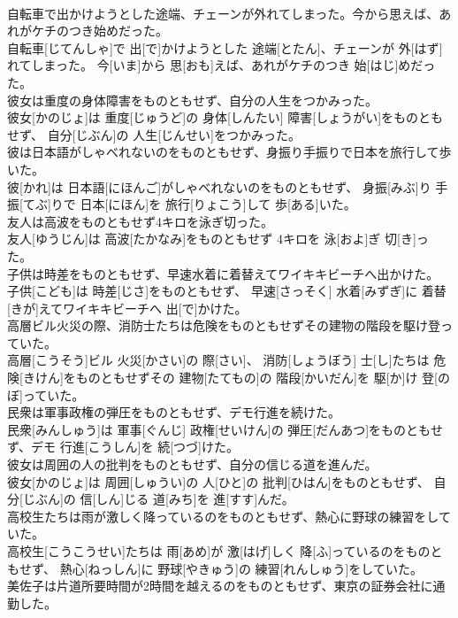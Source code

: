 \documentclass[8pt]{extreport}
\begin{document}
\begin{CJK}{UTF8}{min}
\\	自転車で出かけようとした途端、チェーンが外れてしまった。今から思えば、あれがケチのつき始めだった。	
\\	自転車[じてんしゃ]で 出[で]かけようとした 途端[とたん]、チェーンが 外[はず]れてしまった。 今[いま]から 思[おも]えば、あれがケチのつき 始[はじ]めだった。
\\	彼女は重度の身体障害をものともせず、自分の人生をつかみった。	
\\	彼女[かのじょ]は 重度[じゅうど]の 身体[しんたい] 障害[しょうがい]をものともせず、 自分[じぶん]の 人生[じんせい]をつかみった。
\\	彼は日本語がしゃべれないのをものともせず、身振り手振りで日本を旅行して歩いた。	
\\	彼[かれ]は 日本語[にほんご]がしゃべれないのをものともせず、 身振[みぶ]り 手振[てぶ]りで 日本[にほん]を 旅行[りょこう]して 歩[ある]いた。
\\	友人は高波をものともせず4キロを泳ぎ切った。	
\\	友人[ゆうじん]は 高波[たかなみ]をものともせず 4キロを 泳[およ]ぎ 切[き]った。
\\	子供は時差をものともせず、早速水着に着替えてワイキキビーチへ出かけた。	
\\	子供[こども]は 時差[じさ]をものともせず、 早速[さっそく] 水着[みずぎ]に 着替[きが]えてワイキキビーチへ 出[で]かけた。
\\	高層ビル火災の際、消防士たちは危険をものともせずその建物の階段を駆け登っていた。	
\\	高層[こうそう]ビル 火災[かさい]の 際[さい]、 消防[しょうぼう] 士[し]たちは 危険[きけん]をものともせずその 建物[たてもの]の 階段[かいだん]を 駆[か]け 登[のぼ]っていた。
\\	民衆は軍事政権の弾圧をものともせず、デモ行進を続けた。	
\\	民衆[みんしゅう]は 軍事[ぐんじ] 政権[せいけん]の 弾圧[だんあつ]をものともせず、デモ 行進[こうしん]を 続[つづ]けた。
\\	彼女は周囲の人の批判をものともせず、自分の信じる道を進んだ。	
\\	彼女[かのじょ]は 周囲[しゅうい]の 人[ひと]の 批判[ひはん]をものともせず、 自分[じぶん]の 信[しん]じる 道[みち]を 進[すす]んだ。
\\	高校生たちは雨が激しく降っているのをものともせず、熱心に野球の練習をしていた。	
\\	高校生[こうこうせい]たちは 雨[あめ]が 激[はげ]しく 降[ふ]っているのをものともせず、 熱心[ねっしん]に 野球[やきゅう]の 練習[れんしゅう]をしていた。
\\	美佐子は片道所要時間が2時間を越えるのをものともせず、東京の証券会社に通勤した。	

\end{CJK}
\end{document}
